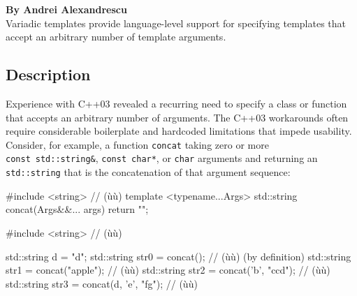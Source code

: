 
\label{variadic-templates}
\setcounter{table}{0}
\setcounter{footnote}{0}
\setcounter{lstlisting}{0}

\noindent\textbf{By Andrei Alexandrescu}\\[.5ex]


Variadic templates provide language-level support for specifying
templates that accept an arbitrary number of template arguments.

\subsection[Description]{Description}\label{description-variadic}

Experience with C++03 revealed a recurring need to specify a class or
function that accepts an arbitrary number of arguments. The C++03
workarounds often require considerable boilerplate and hardcoded
limitations that impede usability. Consider, for example, a function
\lstinline!concat! taking zero or more
\lstinline!const!~\lstinline!std::string&!, \lstinline!const!~\lstinline!char*!, or
\lstinline!char! arguments and returning an \lstinline!std::string! that is
the concatenation of that argument sequence:

\begin{emcppshiddenlisting}[emcppsbatch=e1]
#include <string>  // (ù{}ù)
template <typename...Args>
std::string concat(Args&&... args) { return ""; }
\end{emcppshiddenlisting}
\begin{emcppslisting}[emcppsbatch=e1]
#include <string>  // (ù{}ù)

std::string d = "d";
std::string str0 = concat();                // (ù{}ù) (by definition)
std::string str1 = concat("apple");         // (ù{}ù)
std::string str2 = concat('b', "ccd");      // (ù{}ù)
std::string str3 = concat(d, 'e', "fg");    // (ù{}ù)
\end{emcppslisting}
    

